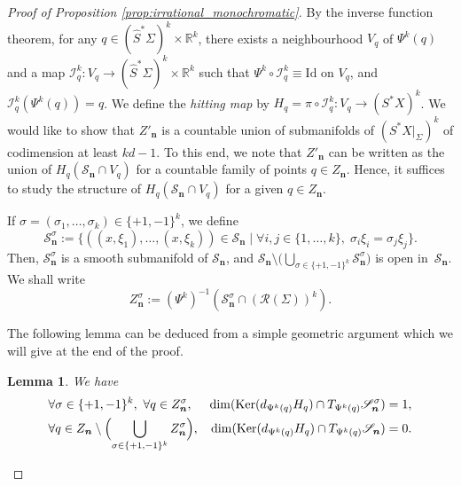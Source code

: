 \documentclass[JEP,XML,SOM,Unicode,published]{cedram}
\let\mathcal\mathscr
\let\sep\mid
\DeclareMathOperator{\Ker}{Ker}
\theoremstyle{plain}
\newtheorem{lemma}[theorem]{Lemma}
\theoremstyle{definition}
\newcommand{\R}{\mathbb{R}}
\def\calS{\mathcal{S}}
\begin{document}
\begin{proof}[Proof of Proposition \ref{prop:irrational_monochromatic}]
By the inverse function theorem, for any $q\in (\hat{S}^*\Sigma)^k \times \R^k$, there exists a neighbourhood $V_q$ of $\Psi^k(q)$ and a map $\mathcal{I}^k_q : V_q \to (\hat{S}^*\Sigma)^k \times \R^k$ such that $\Psi^k \circ \mathcal{I}^k_q \equiv \mathrm{Id}$ on $V_q$, and $\mathcal{I}^k_q (\Psi^k(q)) = q$. We define the \emph{hitting map} by $H_q = \pi \circ \mathcal{I}^k_q : V_q \to (S^*X)^k$. We would like to show that $Z'_{\boldsymbol{n}}$ is a countable union of submanifolds of $(S^*X|_\Sigma)^k$ of codimension at least $kd-1$. To this end, we note that $Z'_{\boldsymbol{n}}$ can be written as the union of $H_q (\mathcal{S}_{\boldsymbol{n}} \cap V_q)$ for a countable family of points $q\in Z_{\boldsymbol{n}}$. Hence, it suffices to study the structure of $H_q (\mathcal{S}_{\boldsymbol{n}} \cap V_q)$ for a given $q\in Z_{\boldsymbol{n}}$.

If $\sigma=(\sigma_1,\dots,\sigma_k)\in\{+1,-1\}^k$, we define
\[
\calS^\sigma_{\boldsymbol{n}} := \bigl\{ ((x,\xi_1),\dots,(x,\xi_k))\in\calS_{\boldsymbol{n}} \sep \forall i,j\in\{1,\dots,k\}, \;\sigma_i\xi_i=\sigma_j\xi_j \bigr\}.
\]
Then, $\calS^\sigma_{\boldsymbol{n}}$ is a smooth submanifold of $\calS_{\boldsymbol{n}}$, and $\calS_{\boldsymbol{n}}\setminus\bigl(\bigcup_{\sigma\in\{+1,-1\}^k}\calS^\sigma_{\boldsymbol{n}}\bigr)$ is open in~$\calS_{\boldsymbol{n}}$. We shall write
\[
Z_{\boldsymbol{n}}^\sigma := (\Psi^k)^{-1} \left(\calS^\sigma_{\boldsymbol{n}} \cap (\mathcal{R}(\Sigma))^k\right).
\]

The following lemma can be deduced from a simple geometric argument which we will give at the end of the proof.

\begin{lemma}\label{lem:RanProj}
We have
\begin{align*}
&\forall \sigma\in\{+1,-1\}^k,~ \forall q \in Z_{\boldsymbol{n}}^\sigma,&\dim(\Ker(d_{\Psi^k(q)} H_q)\cap T_{\Psi^k(q)}\calS_{\boldsymbol{n}}^\sigma)=1,\\
&\forall q \in Z_{\boldsymbol{n}} \setminus\Bigl(\bigcup_{\sigma\in\{+1,-1\}^k}Z_{\boldsymbol{n}}^\sigma\Bigr), &\dim(\Ker(d_{\Psi^k(q)} H_q)\cap T_{\Psi^k(q)}\calS_{\boldsymbol{n}})=0.
\end{align*}
\end{lemma}


\end{proof}
\end{document}
